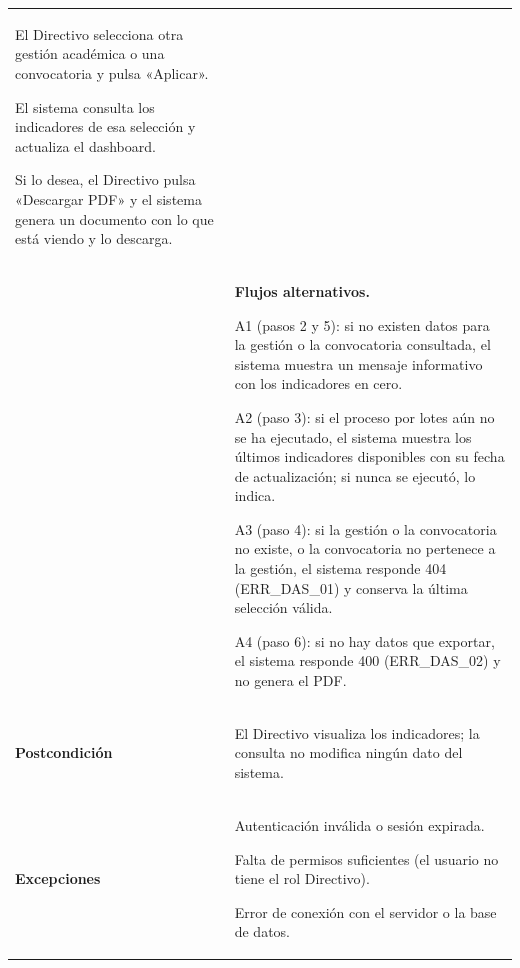 \begin{longtable}{>{\raggedright\arraybackslash}p{2.9cm} >{\raggedright\arraybackslash}p{12.6cm}}
\begin{cupasos}
    \item El Directivo selecciona otra gestión académica o una convocatoria y pulsa «Aplicar».
    \item El sistema consulta los indicadores de esa selección y actualiza el dashboard.
    \item Si lo desea, el Directivo pulsa «Descargar PDF» y el sistema genera un documento con lo que está viendo y lo descarga.
\end{cupasos} \\
 & \textbf{Flujos alternativos.}
\begin{cuvin}
    \item A1 (pasos 2 y 5): si no existen datos para la gestión o la convocatoria consultada, el sistema muestra un mensaje informativo con los indicadores en cero.
    \item A2 (paso 3): si el proceso por lotes aún no se ha ejecutado, el sistema muestra los últimos indicadores disponibles con su fecha de actualización; si nunca se ejecutó, lo indica.
    \item A3 (paso 4): si la gestión o la convocatoria no existe, o la convocatoria no pertenece a la gestión, el sistema responde 404 (ERR\_DAS\_01) y conserva la última selección válida.
    \item A4 (paso 6): si no hay datos que exportar, el sistema responde 400 (ERR\_DAS\_02) y no genera el PDF.
\end{cuvin} \\
\midrule
\textbf{Postcondición} & \vspace{-\baselineskip}\begin{cuvin}
    \item El Directivo visualiza los indicadores; la consulta no modifica ningún dato del sistema.
\end{cuvin} \\
\midrule
\textbf{Excepciones} & \vspace{-\baselineskip}\begin{cuvin}
    \item Autenticación inválida o sesión expirada.
    \item Falta de permisos suficientes (el usuario no tiene el rol Directivo).
    \item Error de conexión con el servidor o la base de datos.
\end{cuvin} \\
\end{longtable}
\endgroup
\addtocounter{table}{-1}

